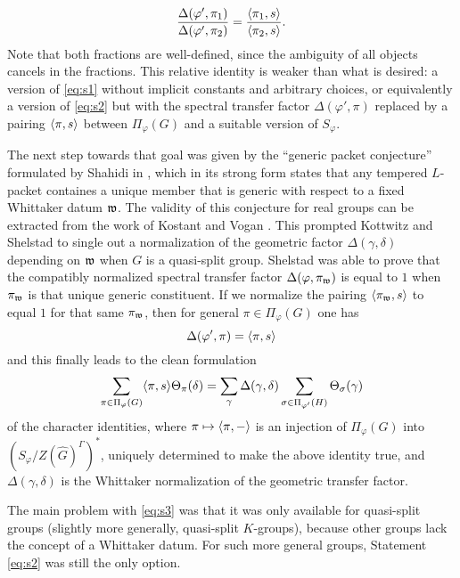 \documentclass{article}
\theoremstyle{definition}
\numberwithin{equation}{section}
\renewcommand{\-}{\hyp{}}
\begin{document}
\[ \frac{\Delta(\varphi',\pi_1)}{\Delta(\varphi',\pi_2)} = \frac{\langle\pi_1,s\rangle}{\langle\pi_2,s\rangle}.\]
Note that both fractions are well-defined, since the ambiguity of all objects cancels in the fractions. This relative identity is weaker than what is desired: a version of \eqref{eq:s1} without implicit constants and arbitrary choices, or equivalently a version of \eqref{eq:s2} but with the spectral transfer factor $\Delta(\varphi',\pi)$ replaced by a pairing $\langle\pi,s\rangle$ between $\Pi_\varphi(G)$ and a suitable version of $S_\varphi$.

The next step towards that goal was given by the ``generic packet conjecture'' formulated by Shahidi in \cite{Sha90}, which in its strong form states that any tempered $L$\-packet containes a unique member that is generic with respect to a fixed Whittaker datum $\mathfrak{w}$. The validity of this conjecture for real groups can be extracted from the work of Kostant \cite{Kos78} and Vogan \cite{Vog78}. This prompted Kottwitz and Shelstad to single out \cite[\S5.3]{KS99} a normalization of the geometric factor $\Delta(\gamma,\delta)$ depending on $\mathfrak{w}$ when $G$ is a quasi-split group. Shelstad was able to prove \cite[Theorem 11.5]{SheTE3} that the compatibly normalized spectral transfer factor $\Delta(\varphi,\pi_{\mathfrak{w}})$ is equal to $1$ when $\pi_{\mathfrak{w}}$ is that unique generic constituent. If we normalize the pairing $\langle\pi_{\mathfrak{w}},s\rangle$ to equal $1$ for that same $\pi_{\mathfrak{w}}$, then for general $\pi \in \Pi_\varphi(G)$ one has
\[ \Delta(\varphi',\pi) = \langle\pi,s\rangle \]
and this finally leads to the clean formulation
\begin{equation} \label{eq:s3}
	\sum_{\pi \in \Pi_\varphi(G)}\langle\pi,s\rangle\Theta_\pi(\delta) = \sum_\gamma \Delta(\gamma,\delta)\sum_{\sigma \in \Pi_{\varphi'}(H)} \Theta_{\sigma}(\gamma)
\end{equation}
of the character identities, where $\pi \mapsto \langle\pi,-\rangle$ is an injection of $\Pi_\varphi(G)$ into $(S_\varphi/Z(\hat G)^\Gamma)^*$, uniquely determined to make the above identity true, and $\Delta(\gamma,\delta)$ is the Whittaker normalization of the geometric transfer factor.

The main problem with \eqref{eq:s3} was that it was only available for quasi-split groups (slightly more generally, quasi-split $K$-groups), because other groups lack the concept of a Whittaker datum. For such more general groups, Statement \eqref{eq:s2} was still the only option. 
\end{document}
